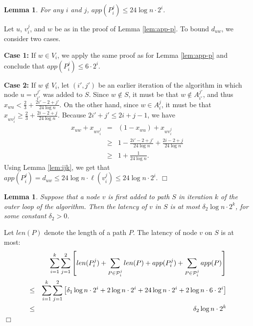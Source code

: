 \documentclass[11pt]{article}
\newcommand{\qed}{\hspace*{\fill}$\Box$}
\newtheorem{lemma}[theorem]{Lemma}
\newenvironment{proof}[1][Proof. ]{\noindent {\bf #1 }}{\qed}
\begin{document}
\begin{lemma} \label{lem:app-pij}
For any $i$ and $j$, $app(P^j_i)\leq 24 \log n \cdot 2^i$.
\end{lemma}
\begin{proof}
Let $u$, $v^j_i$, and $w$ be as in the proof of Lemma \ref{lem:app-p}.
To bound $d_{uw}$, we consider two cases.

{\bf Case 1:} If $w\in V_i$, we apply the same proof as for Lemma \ref{lem:app-p} and conclude that $app(P^j_i)\leq 6 \cdot 2^i$.

{\bf Case 2:} If $w\not\in V_i$, let $(i',j')$ be an earlier iteration of the algorithm in which node $u = v^{j'}_{i'}$ was added to $S$. Since $w\notin S$, it must be that $w\notin A^{j'}_{i'}$, and thus $x_{wu} < \frac{2}{3}+\frac{2i'-2+j'}{24\log n}$. On the other hand, since $w\in A^j_i$, it must be that $x_{wv^j_i} \geq \frac{2}{3}+\frac{2i-2+j}{24\log n}$. Because $2i'+j' \leq 2i+j-1$, we have
\begin{eqnarray*}
x_{uw}+x_{wv^j_i}  &=& (1 - x_{wu})+x_{wv^j_i} \\
 &\geq & 1 - \frac{2i'-2+j'}{24\log n} +\frac{2i-2+j}{24\log n} \\
 &\geq & 1 + \frac{1}{24\log n}.
\end{eqnarray*}
Using Lemma \ref{lem:ijk}, we get that 
$app(P^j_i) = d_{uw} \leq 24 \log n \cdot \ell(v^j_i) \leq 24 \log n \cdot 2^i$. 
\end{proof}



\begin{lemma}\label{lem:Pi-late}
Suppose that a node $v$ is first added to path $S$ in iteration $k$ of the outer loop of the algorithm. Then the latency of $v$ in $S$ is at most $\delta_2 \log n \cdot 2^k$, for some constant $\delta_2>0$.
\end{lemma}
\begin{proof}
Let $len(P)$ denote the length of a path $P$.  The latency of node $v$ on $S$ is at most:
\begin{eqnarray*}
&& \sum_{i=1}^k \sum_{j=1}^2 \left[ 
len(P^j_i) + \sum_{P\in {\cal P}^j_i} len(P) 
+ app(P^j_i) + \sum_{P\in {\cal P}^j_i} app(P) \right] \\
&\leq& 
\sum_{i=1}^k \sum_{j=1}^2 \left[ 
\delta_1 \log n \cdot 2^i + 2 \log n \cdot 2^i   
+ 24 \log n \cdot 2^i + 2 \log n \cdot 6 \cdot 2^i \right] \\
 & \leq & \delta_2 \log n \cdot 2^k  
\end{eqnarray*}
\end{proof}
\end{document}
